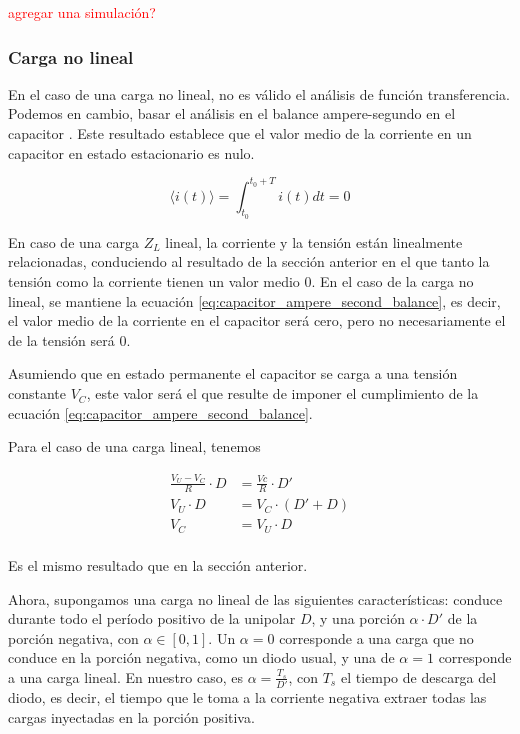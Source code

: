 \textcolor{red}{agregar una simulación?}

\subsubsection{Carga no lineal}
\label{sec:carga_no_lineal}

En el caso de una carga no lineal, no es válido el análisis de función
transferencia. Podemos en cambio, basar el análisis en el balance ampere-segundo
en el capacitor \cite{Erickson_Robert_W_2020}. Este resultado establece que el
valor medio de la corriente en un capacitor en estado estacionario es nulo.

\begin{equation}
    \label{eq:capacitor_ampere_second_balance}
    \langle i(t) \rangle = \int_{t_0}^{t_0+T} i(t)dt = 0
\end{equation}

En caso de una carga $Z_L$ lineal, la corriente y la tensión están linealmente
relacionadas, conduciendo al resultado de la sección anterior en el que tanto la
tensión como la corriente tienen un valor medio 0. En el caso de la carga no
lineal, se mantiene la ecuación \ref{eq:capacitor_ampere_second_balance}, es
decir, el valor medio de la corriente en el capacitor será cero, pero no
necesariamente el de la tensión será 0.

Asumiendo que en estado permanente el capacitor se carga a una tensión constante
$V_C$, este valor será el que resulte de imponer el cumplimiento de la ecuación
\ref{eq:capacitor_ampere_second_balance}.

Para el caso de una carga lineal, tenemos

\begin{equation}
    \label{eq:vc_linear_load}
    \begin{aligned}
        \frac{V_U-V_C}{R} \cdot D &= \frac{Vc}{R} \cdot D' \\
        V_U \cdot D &= V_C \cdot \left( D'+D \right) \\
        V_C &= V_U \cdot D \\
    \end{aligned}
\end{equation}

Es el mismo resultado que en la sección anterior.

Ahora, supongamos una carga no lineal de las siguientes características: conduce
durante todo el período positivo de la unipolar $D$, y una porción $\alpha \cdot
D'$ de la porción negativa, con $\alpha \in \left[0, 1 \right]$. Un $\alpha=0$
corresponde a una carga que no conduce en la porción negativa, como un diodo
usual, y una de $\alpha=1$ corresponde a una carga lineal. En nuestro caso, es
$\alpha = \frac{T_s}{D'}$, con $T_s$ el tiempo de descarga del diodo, es decir,
el tiempo que le toma  a la corriente negativa extraer todas las cargas
inyectadas en la porción positiva.

